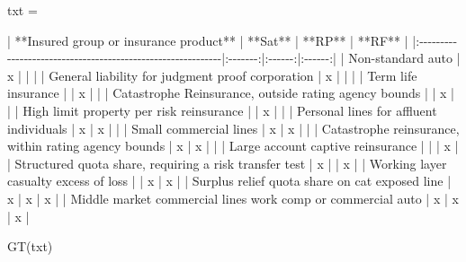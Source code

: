 \documentclass[
  11pt,
  a4paper,
  DIV=11,
  numbers=noendperiod]{scrartcl}
\newenvironment{Shaded}{\begin{snugshade}}{\end{snugshade}}
\newcommand{\NormalTok}[1]{\textcolor[rgb]{0.00,0.23,0.31}{#1}}
\newcommand{\OperatorTok}[1]{\textcolor[rgb]{0.37,0.37,0.37}{#1}}
\newcommand{\StringTok}[1]{\textcolor[rgb]{0.13,0.47,0.30}{#1}}
\begin{document}
\begin{Shaded}
\begin{Highlighting}[]
\NormalTok{txt }\OperatorTok{=} \StringTok{\textquotesingle{}\textquotesingle{}\textquotesingle{}}

\StringTok{| **Insured group or insurance product**                      | **Sat** | **RP** | **RF** |}
\StringTok{|:{-}{-}{-}{-}{-}{-}{-}{-}{-}{-}{-}{-}{-}{-}{-}{-}{-}{-}{-}{-}{-}{-}{-}{-}{-}{-}{-}{-}{-}{-}{-}{-}{-}{-}{-}{-}{-}{-}{-}{-}{-}{-}{-}{-}{-}{-}{-}{-}{-}{-}{-}{-}{-}{-}{-}{-}{-}{-}{-}{-}|:{-}{-}{-}{-}{-}{-}{-}:|:{-}{-}{-}{-}{-}{-}:|:{-}{-}{-}{-}{-}{-}:|}
\StringTok{| Non{-}standard auto                                           |    x    |        |        |}
\StringTok{| General liability for judgment proof corporation            |    x    |        |        |}
\StringTok{| Term life insurance                                         |         |   x    |        |}
\StringTok{| Catastrophe Reinsurance, outside rating agency bounds       |         |   x    |        |}
\StringTok{| High limit property per risk reinsurance                    |         |   x    |        |}
\StringTok{| Personal lines for affluent individuals                     |    x    |   x    |        |}
\StringTok{| Small commercial lines                                      |    x    |   x    |        |}
\StringTok{| Catastrophe reinsurance, within rating agency bounds        |    x    |   x    |        |}
\StringTok{| Large account captive reinsurance                           |         |        |   x    |}
\StringTok{| Structured quota share, requiring a risk transfer test      |    x    |        |   x    |}
\StringTok{| Working layer casualty excess of loss                       |         |   x    |   x    |}
\StringTok{| Surplus relief quota share on cat exposed line              |    x    |   x    |   x    |}
\StringTok{| Middle market commercial lines work comp or commercial auto |    x    |   x    |   x    |}


\StringTok{\textquotesingle{}\textquotesingle{}\textquotesingle{}}

\NormalTok{GT(txt)}
\end{Highlighting}
\end{Shaded}
\end{document}
